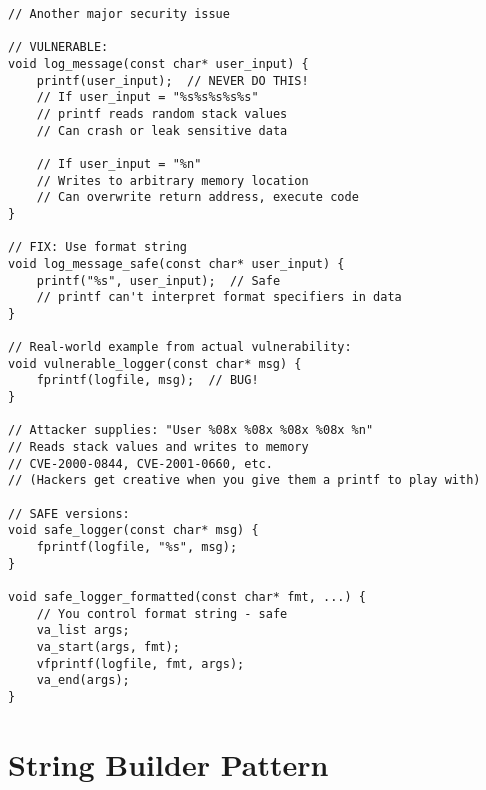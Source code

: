 \begin{lstlisting}
// Another major security issue

// VULNERABLE:
void log_message(const char* user_input) {
    printf(user_input);  // NEVER DO THIS!
    // If user_input = "%s%s%s%s%s"
    // printf reads random stack values
    // Can crash or leak sensitive data

    // If user_input = "%n"
    // Writes to arbitrary memory location
    // Can overwrite return address, execute code
}

// FIX: Use format string
void log_message_safe(const char* user_input) {
    printf("%s", user_input);  // Safe
    // printf can't interpret format specifiers in data
}

// Real-world example from actual vulnerability:
void vulnerable_logger(const char* msg) {
    fprintf(logfile, msg);  // BUG!
}

// Attacker supplies: "User %08x %08x %08x %08x %n"
// Reads stack values and writes to memory
// CVE-2000-0844, CVE-2001-0660, etc.
// (Hackers get creative when you give them a printf to play with)

// SAFE versions:
void safe_logger(const char* msg) {
    fprintf(logfile, "%s", msg);
}

void safe_logger_formatted(const char* fmt, ...) {
    // You control format string - safe
    va_list args;
    va_start(args, fmt);
    vfprintf(logfile, fmt, args);
    va_end(args);
}
\end{lstlisting}

\section{String Builder Pattern}

